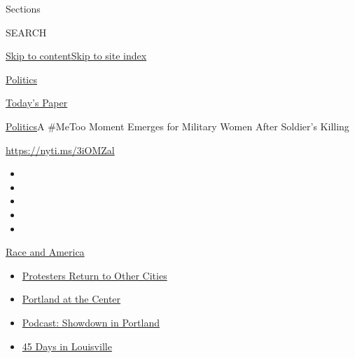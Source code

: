 Sections

SEARCH

\protect\hyperlink{site-content}{Skip to
content}\protect\hyperlink{site-index}{Skip to site index}

\href{https://www.nytimes.com/section/politics}{Politics}

\href{https://myaccount.nytimes.com/auth/login?response_type=cookie\&client_id=vi}{}

\href{https://www.nytimes.com/section/todayspaper}{Today's Paper}

\href{/section/politics}{Politics}\textbar{}A \#MeToo Moment Emerges for
Military Women After Soldier's Killing

\url{https://nyti.ms/3iOMZal}

\begin{itemize}
\item
\item
\item
\item
\item
\end{itemize}

\href{https://www.nytimes.com/news-event/george-floyd-protests-minneapolis-new-york-los-angeles?action=click\&pgtype=Article\&state=default\&region=TOP_BANNER\&context=storylines_menu}{Race
and America}

\begin{itemize}
\tightlist
\item
  \href{https://www.nytimes.com/2020/07/26/us/protests-portland-seattle-trump.html?action=click\&pgtype=Article\&state=default\&region=TOP_BANNER\&context=storylines_menu}{Protesters
  Return to Other Cities}
\item
  \href{https://www.nytimes.com/2020/07/24/us/portland-oregon-protests-white-race.html?action=click\&pgtype=Article\&state=default\&region=TOP_BANNER\&context=storylines_menu}{Portland
  at the Center}
\item
  \href{https://www.nytimes.com/2020/07/23/podcasts/the-daily/portland-protests.html?action=click\&pgtype=Article\&state=default\&region=TOP_BANNER\&context=storylines_menu}{Podcast:
  Showdown in Portland}
\item
  \href{https://www.nytimes.com/interactive/2020/07/16/us/black-lives-matter-protests-louisville-breonna-taylor.html?action=click\&pgtype=Article\&state=default\&region=TOP_BANNER\&context=storylines_menu}{45
  Days in Louisville}
\end{itemize}

